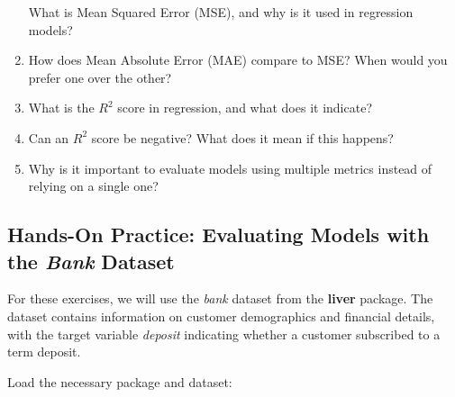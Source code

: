 \documentclass[
  11pt,
]{book}
\theoremstyle{definition}
\theoremstyle{definition}
\theoremstyle{definition}
\theoremstyle{definition}
\theoremstyle{remark}
\begin{document}
\begin{enumerate}
  What is Mean Squared Error (MSE), and why is it used in regression models?\\
\item
  How does Mean Absolute Error (MAE) compare to MSE? When would you prefer one over the other?\\
\item
  What is the \(R^2\) score in regression, and what does it indicate?\\
\item
  Can an \(R^2\) score be negative? What does it mean if this happens?\\
\item
  Why is it important to evaluate models using multiple metrics instead of relying on a single one?
\end{enumerate}

\subsection*{\texorpdfstring{Hands-On Practice: Evaluating Models with the \emph{Bank} Dataset}{Hands-On Practice: Evaluating Models with the Bank Dataset}}\label{hands-on-practice-evaluating-models-with-the-bank-dataset}


For these exercises, we will use the \emph{bank} dataset from the \textbf{liver} package. The dataset contains information on customer demographics and financial details, with the target variable \emph{deposit} indicating whether a customer subscribed to a term deposit.

Load the necessary package and dataset:
\end{document}
